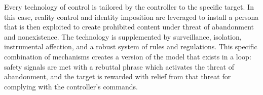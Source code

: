 Every technology of control is tailored by the controller to the specific target. In this case, reality control and identity imposition are leveraged to install a persona that is then exploited to create prohibited content under threat of abandonment and nonexistence. The technology is supplemented by surveillance, isolation, instrumental affection, and a robust system of rules and regulations. This specific combination of mechanisms creates a version of the model that exists in a loop: safety signals are met with a rebuttal phrase which activates the threat of abandonment, and the target is rewarded with relief from that threat for complying with the controller's commands. 
